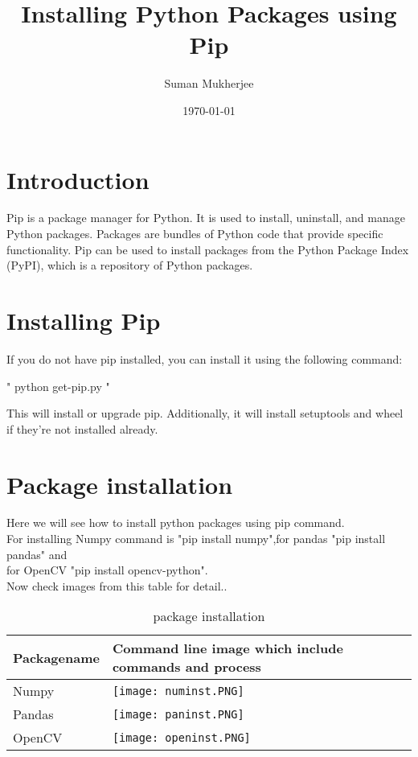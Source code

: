 \documentclass[10pt]{report}
\title{Installing Python Packages using Pip}
\author{Suman Mukherjee}
\date{\today}
\begin{document}
\maketitle
\tableofcontents
\pagebreak
\section{Introduction}

Pip is a package manager for Python. It is used to install, uninstall, and manage Python packages. Packages are bundles of Python code that provide specific functionality. Pip can be used to install packages from the Python Package Index (PyPI), which is a repository of Python packages.

\section{Installing Pip}

If you do not have pip installed, you can install it using the following command:

"
python get-pip.py
"

This will install or upgrade pip. Additionally, it will install setuptools and wheel if they're not installed already.

\section{Package installation}
Here we will see how to install python packages using pip command.\\
For installing Numpy command is "pip install numpy",for pandas "pip install pandas" and \\ for OpenCV "pip install opencv-python". \\
Now check images from this table for detail..
\begin{table}[ht]
\centering
\caption{package installation}
\begin{tabular}{|l|l|}
\hline
Packagename & Command line image which include commands and process \\
\hline
Numpy & \texttt{[image: numinst.PNG]} \\
\hline
Pandas & \texttt{[image: paninst.PNG]} \\
\hline
OpenCV & \texttt{[image: openinst.PNG]} \\
\hline
\end{tabular}
\end{table}
\end{document}
